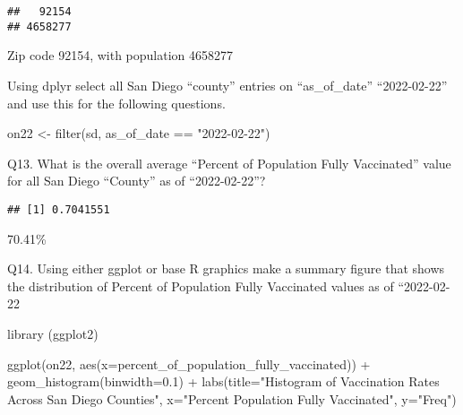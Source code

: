 \documentclass[
]{article}
\newenvironment{Shaded}{\begin{snugshade}}{\end{snugshade}}
\newcommand{\AttributeTok}[1]{\textcolor[rgb]{0.77,0.63,0.00}{#1}}
\newcommand{\ConstantTok}[1]{\textcolor[rgb]{0.00,0.00,0.00}{#1}}
\newcommand{\FloatTok}[1]{\textcolor[rgb]{0.00,0.00,0.81}{#1}}
\newcommand{\FunctionTok}[1]{\textcolor[rgb]{0.00,0.00,0.00}{#1}}
\newcommand{\NormalTok}[1]{#1}
\newcommand{\OtherTok}[1]{\textcolor[rgb]{0.56,0.35,0.01}{#1}}
\newcommand{\SpecialCharTok}[1]{\textcolor[rgb]{0.00,0.00,0.00}{#1}}
\newcommand{\StringTok}[1]{\textcolor[rgb]{0.31,0.60,0.02}{#1}}
\begin{document}
\begin{verbatim}
##   92154 
## 4658277
\end{verbatim}

Zip code 92154, with population 4658277

Using dplyr select all San Diego ``county'' entries on ``as\_of\_date''
``2022-02-22'' and use this for the following questions.

\begin{Shaded}
\begin{Highlighting}[]
\NormalTok{on22 }\OtherTok{\textless{}{-}} \FunctionTok{filter}\NormalTok{(sd, as\_of\_date }\SpecialCharTok{==} \StringTok{"2022{-}02{-}22"}\NormalTok{)}
\end{Highlighting}
\end{Shaded}

Q13. What is the overall average ``Percent of Population Fully
Vaccinated'' value for all San Diego ``County'' as of ``2022-02-22''?

\begin{Shaded}
\end{Shaded}

\begin{verbatim}
## [1] 0.7041551
\end{verbatim}

70.41\%

Q14. Using either ggplot or base R graphics make a summary figure that
shows the distribution of Percent of Population Fully Vaccinated values
as of ``2022-02-22

\begin{Shaded}
\begin{Highlighting}[]
\FunctionTok{library}\NormalTok{ (ggplot2)}

\FunctionTok{ggplot}\NormalTok{(on22, }\FunctionTok{aes}\NormalTok{(}\AttributeTok{x=}\NormalTok{percent\_of\_population\_fully\_vaccinated)) }\SpecialCharTok{+} \FunctionTok{geom\_histogram}\NormalTok{(}\AttributeTok{binwidth=}\FloatTok{0.1}\NormalTok{) }\SpecialCharTok{+} \FunctionTok{labs}\NormalTok{(}\AttributeTok{title=}\StringTok{"Histogram of Vaccination Rates Across San Diego Counties"}\NormalTok{, }\AttributeTok{x=}\StringTok{"Percent Population Fully Vaccinated"}\NormalTok{, }\AttributeTok{y=}\StringTok{"Freq"}\NormalTok{)}
\end{Highlighting}
\end{Shaded}
\end{document}
